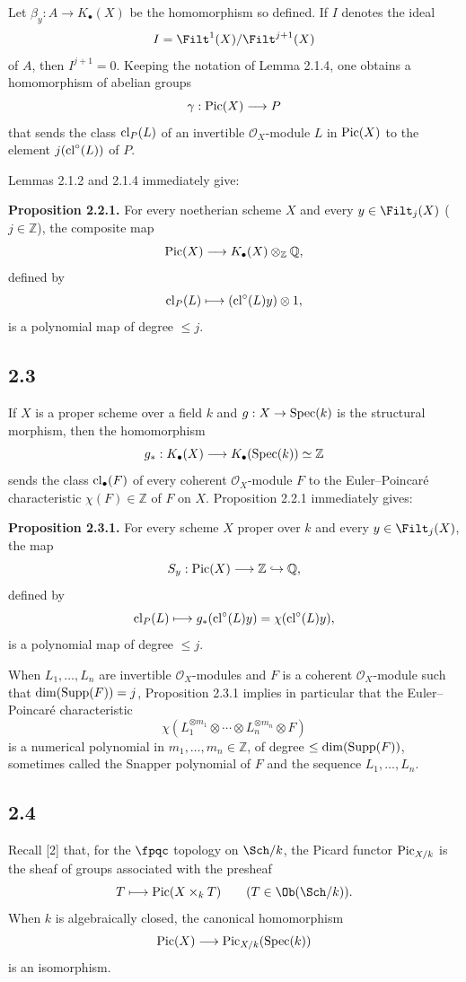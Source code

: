 Let $\beta_y:A\to K_\bullet(X)$ be the homomorphism so defined. If $I$
denotes the ideal
\[
I=\Filt^1(X)/\Filt^{j+1}(X)
\]
of $A$, then $I^{j+1}=0$. Keeping the notation of Lemma 2.1.4, one obtains a
homomorphism of abelian groups
\[
\gamma:\operatorname{Pic}(X)\longrightarrow P
\]
that sends the class $\operatorname{cl}_P(L)$ of an invertible $\mathcal O_X$-module $L$
in $\operatorname{Pic}(X)$ to the element $j(\operatorname{cl}^\circ(L))$ of $P$.

Lemmas 2.1.2 and 2.1.4 immediately give:

\textbf{Proposition 2.2.1.}
For every noetherian scheme $X$ and every $y\in\Filt_j(X)$
($j\in\mathbb Z$), the composite map
\[
\operatorname{Pic}(X)\longrightarrow K_\bullet(X)\otimes_{\mathbb Z}\mathbb Q,
\]
defined by
\[
\operatorname{cl}_P(L)\longmapsto(\operatorname{cl}^\circ(L)y)\otimes1,
\]
is a polynomial map of degree $\leq j$.

\subsection*{2.3}
If $X$ is a proper scheme over a field $k$ and
$g:X\to\operatorname{Spec}(k)$ is the structural morphism, then the homomorphism
\[
g_*:K_\bullet(X)\longrightarrow K_\bullet(\operatorname{Spec}(k))\simeq\mathbb Z
\]
sends the class $\operatorname{cl}_\bullet(F)$ of every coherent $\mathcal O_X$-module
$F$ to the Euler--Poincar\'e characteristic $\chi(F)\in\mathbb Z$ of $F$
on $X$. Proposition 2.2.1 immediately gives:

\textbf{Proposition 2.3.1.}
For every scheme $X$ proper over $k$ and every $y\in\Filt_j(X)$, the map
\[
S_y:\operatorname{Pic}(X)\longrightarrow\mathbb Z\hookrightarrow\mathbb Q,
\]
defined by
\[
\operatorname{cl}_P(L)\longmapsto
g_*(\operatorname{cl}^\circ(L)y)=\chi(\operatorname{cl}^\circ(L)y),
\]
is a polynomial map of degree $\leq j$.

When $L_1,\ldots,L_n$ are invertible $\mathcal O_X$-modules and $F$ is a
coherent $\mathcal O_X$-module such that $\dim(\operatorname{Supp}(F))=j$, Proposition
2.3.1 implies in particular that the Euler--Poincar\'e characteristic
\begin{equation}\tag{2.3.2}
\chi(L_1^{\otimes m_1}\otimes\cdots\otimes
L_n^{\otimes m_n}\otimes F)
\end{equation}
is a numerical polynomial in $m_1,\ldots,m_n\in\mathbb Z$, of degree
$\leq\dim(\operatorname{Supp}(F))$, sometimes called the Snapper polynomial of $F$ and
the sequence $L_1,\ldots,L_n$.

\subsection*{2.4}
Recall [2] that, for the $\fpqc$ topology on $\Sch/k$, the Picard functor
$\operatorname{Pic}_{X/k}$ is the sheaf of groups associated with the presheaf
\[
T\longmapsto\Pic(X\times_kT)
\qquad(T\in\Ob(\Sch/k)).
\]
When $k$ is algebraically closed, the canonical homomorphism
\[
\operatorname{Pic}(X)\longrightarrow\operatorname{Pic}_{X/k}(\operatorname{Spec}(k))
\]
is an isomorphism.

